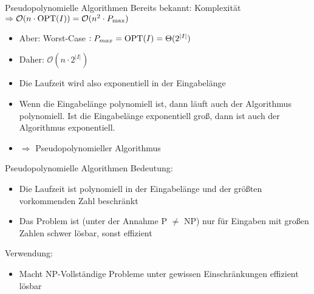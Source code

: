 \begin{frame}{Pseudopolynomielle Algorithmen}
Bereits bekannt: Komplexität $\Rightarrow \mathcal{O}( n \cdot \operatorname{OPT}(I)) = \mathcal{O}( n^2 \cdot P_{\max})$ 
\begin{itemize}
	\item
	Aber: Worst-Case $: P_{max} = \operatorname{OPT}(I) = \Theta(2^{|I|})$
	\item
	Daher: 
	$\mathcal{O}(n\cdot 2^{|I|})$
	\item
	Die Laufzeit wird also exponentiell in der Eingabelänge
	\item
	Wenn die Eingabelänge polynomiell ist, dann läuft auch der Algorithmus polynomiell. Ist die Eingabelänge exponentiell groß, dann ist auch der Algorithmus exponentiell.
	\item $\Rightarrow$ Pseudopolynomieller Algorithmus
\end{itemize}

\end{frame}

\begin{frame}{Pseudopolynomielle Algorithmen}
Bedeutung:

\begin{itemize}
	\item Die Laufzeit ist polynomiell in der Eingabelänge und der größten vorkommenden Zahl beschränkt
	\item Das Problem ist (unter der Annahme P $\neq$ NP) nur für Eingaben mit großen Zahlen schwer lösbar, sonst effizient
\end{itemize}

Verwendung:
\begin{itemize}
	\item Macht NP-Vollständige Probleme unter gewissen Einschränkungen effizient lösbar
\end{itemize}
\end{frame}
